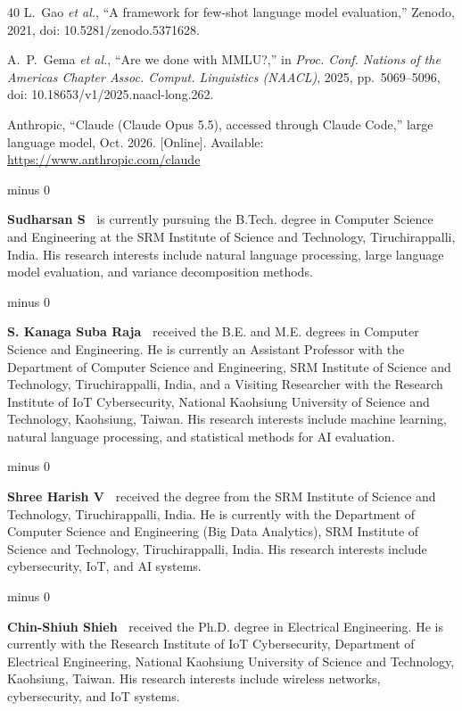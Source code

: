 \documentclass{ieeeaccess}
\makeatletter
\theoremstyle{definition}
\theoremstyle{plain}
\renewenvironment{IEEEbiographynophoto}[1]{%
  \normalfont\@IEEEcompsoconly{\sffamily}\footnotesize\interlinepenalty500%
  \vskip 1\baselineskip minus 0\baselineskip%
  \parskip=0pt\par%
  \noindent\textbf{#1\ }\@IEEEgobbleleadPARNLSP}{\relax\par\normalfont}
\makeatother
\begin{document}
\begin{thebibliography}{40}
 L.~Gao \emph{et al.}, ``A framework for few-shot language model
evaluation,'' Zenodo, 2021, doi: 10.5281/zenodo.5371628.

 A.~P.~Gema \emph{et al.}, ``Are we done with MMLU?,'' in \emph{Proc. Conf. Nations of the Americas Chapter Assoc. Comput. Linguistics (NAACL)}, 2025, pp.~5069--5096, doi: 10.18653/v1/2025.naacl-long.262.

 Anthropic, ``Claude (Claude Opus 5.5), accessed through
Claude Code,'' large language model, Oct. 2026. [Online]. Available:
\url{https://www.anthropic.com/claude}

\end{thebibliography}

\begin{IEEEbiographynophoto}{Sudharsan S}
is currently pursuing the B.Tech. degree in Computer Science and Engineering at the SRM Institute of Science and Technology, Tiruchirappalli, India. His research interests include natural language processing, large language model evaluation, and variance decomposition methods.
\end{IEEEbiographynophoto}

\begin{IEEEbiographynophoto}{S. Kanaga Suba Raja}
received the B.E. and M.E. degrees in Computer Science and Engineering. He is currently an Assistant Professor with the Department of Computer Science and Engineering, SRM Institute of Science and Technology, Tiruchirappalli, India, and a Visiting Researcher with the Research Institute of IoT Cybersecurity, National Kaohsiung University of Science and Technology, Kaohsiung, Taiwan. His research interests include machine learning, natural language processing, and statistical methods for AI evaluation.
\end{IEEEbiographynophoto}

\begin{IEEEbiographynophoto}{Shree Harish V}
received the degree from the SRM Institute of Science and Technology, Tiruchirappalli, India. He is currently with the Department of Computer Science and Engineering (Big Data Analytics), SRM Institute of Science and Technology, Tiruchirappalli, India. His research interests include cybersecurity, IoT, and AI systems.
\end{IEEEbiographynophoto}

\begin{IEEEbiographynophoto}{Chin-Shiuh Shieh}
received the Ph.D. degree in Electrical Engineering. He is currently with the Research Institute of IoT Cybersecurity, Department of Electrical Engineering, National Kaohsiung University of Science and Technology, Kaohsiung, Taiwan. His research interests include wireless networks, cybersecurity, and IoT systems.
\end{IEEEbiographynophoto}
\end{document}
